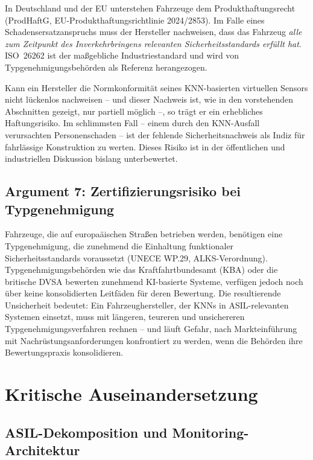 ﻿\documentclass[12pt,a4paper]{article}
\begin{document}
In Deutschland und der EU unterstehen Fahrzeuge dem Produkthaftungsrecht
(ProdHaftG, EU-Produkthaftungsrichtlinie 2024/2853). Im Falle eines
Schadensersatzanspruchs muss der Hersteller nachweisen, dass das Fahrzeug
\emph{alle zum Zeitpunkt des Inverkehrbringens relevanten Sicherheitsstandards
erf\"ullt hat}. ISO~26262 ist der ma\ss{}gebliche Industriestandard und wird
von Typgenehmigungsbeh\"orden als Referenz herangezogen.

Kann ein Hersteller die Normkonformit\"at seines KNN-basierten virtuellen Sensors
nicht l\"uckenlos nachweisen -- und dieser Nachweis ist, wie in den vorstehenden
Abschnitten gezeigt, nur partiell m\"oglich --, so tr\"agt er ein erhebliches
Haftungsrisiko. Im schlimmsten Fall -- einem durch den KNN-Ausfall verursachten
Personenschaden -- ist der fehlende Sicherheitsnachweis als Indiz f\"ur fahrl\"assige
Konstruktion zu werten. Dieses Risiko ist in der \"offentlichen und industriellen
Diskussion bislang unterbewertet.

\subsection{Argument 7: Zertifizierungsrisiko bei Typgenehmigung}
\label{subsec:arg7}

Fahrzeuge, die auf europa\"aischen Stra\ss{}en betrieben werden, ben\"otigen eine
Typgenehmigung, die zunehmend die Einhaltung funktionaler Sicherheitsstandards
voraussetzt (UNECE WP.29, ALKS-Verordnung). Typgenehmigungsbeh\"orden wie das
Kraftfahrtbundesamt (KBA) oder die britische DVSA bewerten zunehmend KI-basierte
Systeme, verf\"ugen jedoch noch \"uber keine konsolidierten Leitf\"aden f\"ur deren
Bewertung. Die resultierende Unsicherheit bedeutet: Ein Fahrzeughersteller,
der KNNs in ASIL-relevanten Systemen einsetzt, muss mit l\"angeren, teureren und
unsichereren Typgenehmigungsverfahren rechnen -- und l\"auft Gefahr, nach
Markteinf\"uhrung mit Nachr\"ustungsanforderungen konfrontiert zu werden, wenn
die Beh\"orden ihre Bewertungspraxis konsolidieren.

\section{Kritische Auseinandersetzung}
\label{sec:gegenargumente}

\subsection{ASIL-Dekomposition und Monitoring-Architektur}
\label{subsec:gegenarg1}
\end{document}
